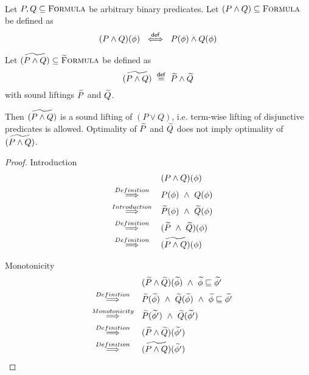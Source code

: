 \begin{lemma}~\\
    Let $P, Q \subseteq \textup{\textsc{Formula}}$ be arbitrary binary predicates.
    Let $(P \wedge Q) \subseteq \textup{\textsc{Formula}}$ be defined as
    \begin{displaymath}
    (P \wedge Q)(\phi) ~\overset{\textup{\textmd{\textsf{def}}}}{\iff}~ P(\phi) \wedge Q(\phi)
    \end{displaymath}
    
    Let $\widetilde{(P \wedge Q)} \subseteq \textup{\textsc{\ensuremath{\widetilde{\text{F}}}ormula}}$ be defined as
    \begin{displaymath}
    \widetilde{(P \wedge Q)} ~\overset{\textup{\textmd{\textsf{def}}}}{=}~ \widetilde{P} \wedge \widetilde{Q}
    \end{displaymath}
    with sound liftings $\widetilde{P}$ and $\widetilde{Q}$.
    
    Then $\widetilde{(P \wedge Q)}$ is a sound lifting of $(P \vee Q)$, i.e. term-wise lifting of disjunctive predicates is allowed.
    Optimality of $\widetilde{P}$ and $\widetilde{Q}$ does not imply optimality of $\widetilde{(P \wedge Q)}$.
\end{lemma}
\begin{proof}
    Introduction
        \begin{align*}
        &(P \wedge Q)(\phi)\\
        \overset{Definition}{~\quad\quad\implies\quad\quad~}
        &P(\phi) ~\wedge~ Q(\phi)\\
        \overset{Introduction}{~\quad\quad\implies\quad\quad~}
        &\widetilde{P}(\phi) ~\wedge~ \widetilde{Q}(\phi)\\
        \overset{Definition}{~\quad\quad\implies\quad\quad~}
        &(\widetilde{P} ~\wedge~ \widetilde{Q})(\phi)\\
        \overset{Definition}{~\quad\quad\implies\quad\quad~}
        &\widetilde{(P \wedge Q)}(\phi)\\
        \end{align*}
    
    Monotonicity
        \begin{align*}
        &(\widetilde{P} \wedge \widetilde{Q})(\widetilde{\phi}) ~\wedge~ \widetilde{\phi} \sqsubseteq \widetilde{\phi'}\\
        \overset{Definition}{~\quad\quad\implies\quad\quad~}
        &\widetilde{P}(\widetilde{\phi}) ~\wedge~ \widetilde{Q}(\widetilde{\phi}) ~\wedge~ \widetilde{\phi} \sqsubseteq \widetilde{\phi'}\\
        \overset{Monotonicity}{~\quad\quad\implies\quad\quad~}
        &\widetilde{P}(\widetilde{\phi'}) ~\wedge~ \widetilde{Q}(\widetilde{\phi'})\\
        \overset{Definition}{~\quad\quad\implies\quad\quad~}
        &(\widetilde{P} \wedge \widetilde{Q})(\widetilde{\phi'})\\
        \overset{Definition}{~\quad\quad\implies\quad\quad~}
        &\widetilde{(P \wedge Q)}(\widetilde{\phi'})\\
        \end{align*}
\end{proof}

